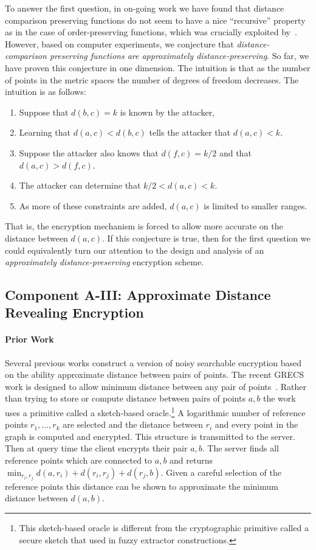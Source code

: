 To answer the first question, in on-going work we have found that distance comparison preserving functions do not seem to have a nice ``recursive'' property as in the case of order-preserving functions, which was crucially exploited by~\cite{EC:BCLO09}.  However, based on computer experiments, we conjecture that \emph{distance-comparison preserving functions are approximately distance-preserving}.    So far, we have proven this conjecture in one dimension.  The intuition is that as the number of points in the metric spaces the number of degrees of freedom decreases.  The intuition is as follows:
\begin{enumerate}
\item Suppose that $d(b,c) = k$ is known by the attacker, 
\item Learning that $d(a,c) < d(b,c)$ tells the attacker that $d(a,c)<k$.  
\item Suppose the attacker also knows that $d(f, c) = k/2$ and that $d(a,c) > d(f,c)$.  
\item The attacker can determine that $k/2< d(a,c) <k$.  
\item As more of these constraints are added, $d(a,c)$ is limited to smaller ranges.
\end{enumerate}
That is, the encryption mechanism is forced to allow more accurate on the distance between $d(a,c)$.
If this conjecture is true, then for the first question we could equivalently turn our attention to the design and analysis of  an \emph{approximately distance-preserving} encryption scheme. 

\subsection{Component A-III: Approximate Distance Revealing Encryption}
\paragraph{Prior Work}
Several previous works construct a version of noisy searchable encryption based on the ability approximate distance between pairs of points.  
The recent GRECS work is designed to allow minimum distance between any pair of points~\cite{meng2015grecs}.  Rather than trying to store or compute distance between pairs of points $a,b$ the work uses a primitive called a sketch-based oracle.\footnote{This sketch-based oracle is different from the cryptographic primitive called a secure sketch that used in fuzzy extractor constructions.}  A logarithmic number of reference points $r_1,..., r_k$ are selected and the distance between $r_i$ and every point in the graph is computed and encrypted.  This structure is transmitted to the server.  Then at query time the client encrypts their pair $a,b$.  The server finds all reference points which are connected to $a,b$ and returns $\min_{r_i, r_j} d(a,r_i) + d(r_i, r_j) + d(r_j, b)$.  Given a careful selection of the reference points this distance can be shown to approximate the minimum distance between $d(a,b)$.

